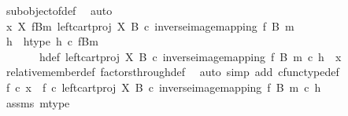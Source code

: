 \begin{isabellebody}
\ subobject{\isacharunderscore}{\kern0pt}of{\isacharunderscore}{\kern0pt}def{}\ \isamarkupfalse%
\ auto\isanewline
\isanewline
\ \ \isamarkupfalse%
\ {\isachardoublequoteopen}x\ {\isasymin}\isactrlbsub X\isactrlesub \ {\isacharparenleft}{\kern0pt}f\isactrlsup {\isacharminus}{\kern0pt}B{\isasymrparr}\isactrlbsub m\isactrlesub {\isacharcomma}{\kern0pt}\ left{\isacharunderscore}{\kern0pt}cart{\isacharunderscore}{\kern0pt}proj\ X\ B\ {\isasymcirc}\isactrlsub c\ inverse{\isacharunderscore}{\kern0pt}image{\isacharunderscore}{\kern0pt}mapping\ f\ B\ m{\isacharparenright}{\kern0pt}{\isachardoublequoteclose}\isanewline
\ \ \isamarkupfalse%
\ \isamarkupfalse%
\ h\ \ h{\isacharunderscore}{\kern0pt}type{\isacharcolon}{\kern0pt}\ {\isachardoublequoteopen}h\ {\isasymin}\isactrlsub c\ {\isacharparenleft}{\kern0pt}f\isactrlsup {\isacharminus}{\kern0pt}B{\isasymrparr}\isactrlbsub m\isactrlesub {\isacharparenright}{\kern0pt}{\isachardoublequoteclose}\isanewline
\ \ \ \ \ \ \ h{\isacharunderscore}{\kern0pt}def{\isacharcolon}{\kern0pt}\ {\isachardoublequoteopen}{\isacharparenleft}{\kern0pt}left{\isacharunderscore}{\kern0pt}cart{\isacharunderscore}{\kern0pt}proj\ X\ B\ {\isasymcirc}\isactrlsub c\ inverse{\isacharunderscore}{\kern0pt}image{\isacharunderscore}{\kern0pt}mapping\ f\ B\ m{\isacharparenright}{\kern0pt}\ {\isasymcirc}\isactrlsub c\ h\ {\isacharequal}{\kern0pt}\ x{\isachardoublequoteclose}\isanewline
\ \ \ \ \isamarkupfalse%
\ relative{\isacharunderscore}{\kern0pt}member{\isacharunderscore}{\kern0pt}def{}\ factors{\isacharunderscore}{\kern0pt}through{\isacharunderscore}{\kern0pt}def\ \isamarkupfalse%
\ {\isacharparenleft}{\kern0pt}auto\ simp\ add{\isacharcolon}{\kern0pt}\ cfunc{\isacharunderscore}{\kern0pt}type{\isacharunderscore}{\kern0pt}def{\isacharparenright}{\kern0pt}\isanewline
\ \ \isamarkupfalse%
\ \isamarkupfalse%
\ {\isachardoublequoteopen}f\ {\isasymcirc}\isactrlsub c\ x\ {\isacharequal}{\kern0pt}\ f\ {\isasymcirc}\isactrlsub c\ left{\isacharunderscore}{\kern0pt}cart{\isacharunderscore}{\kern0pt}proj\ X\ B\ {\isasymcirc}\isactrlsub c\ inverse{\isacharunderscore}{\kern0pt}image{\isacharunderscore}{\kern0pt}mapping\ f\ B\ m\ {\isasymcirc}\isactrlsub c\ h{\isachardoublequoteclose}\isanewline
\ \ \ \ \isamarkupfalse%
\ assms\ m{\isacharunderscore}{\kern0pt}type\ \isamarkupfalse%

\end{isabellebody}
